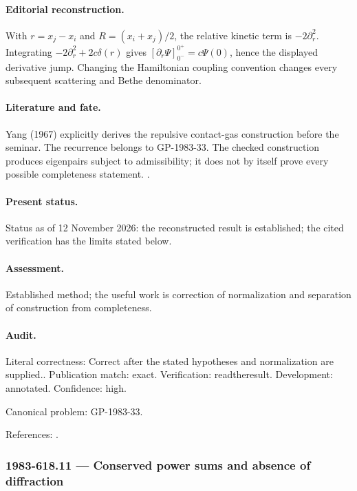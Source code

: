 \paragraph{Editorial reconstruction.} With $r=x_j-x_i$ and $R=(x_i+x_j)/2$, the relative kinetic term is $-2\partial_r^2$. Integrating $-2\partial_r^2+2c\delta(r)$ gives $[\partial_r\Psi]_{0^-}^{0^+}=c\Psi(0)$, hence the displayed derivative jump. Changing the Hamiltonian coupling convention changes every subsequent scattering and Bethe denominator.

\paragraph{Literature and fate.} Yang (1967) explicitly derives the repulsive contact-gas construction before the seminar. The recurrence belongs to GP-1983-33. The checked construction produces eigenpairs subject to admissibility; it does not by itself prove every possible completeness statement. \citep{yang1967manybody}.

\paragraph{Present status.} Status as of 12 November 2026: the reconstructed result is established; the cited verification has the limits stated below.

\paragraph{Assessment.} Established method; the useful work is correction of normalization and separation of construction from completeness.

\paragraph{Audit.} Literal correctness: Correct after the stated hypotheses and normalization are supplied.. Publication match: exact. Verification: readtheresult. Development: annotated. Confidence: high.

\noindent Canonical problem: GP-1983-33.\par

\noindent References: \citep{yang1967manybody}.\par

\subsubsection{1983-618.11 --- Conserved power sums and absence of diffraction}

